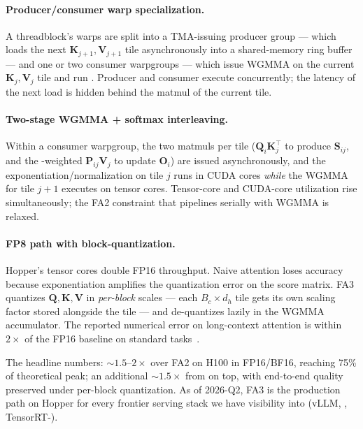 \paragraph{Producer/consumer warp specialization.} A threadblock's
warps are split into a TMA-issuing producer group --- which loads the
next $\boldsymbol{K}_{j+1}, \boldsymbol{V}_{j+1}$ tile asynchronously
into a shared-memory ring buffer --- and one or two consumer
warpgroups --- which issue WGMMA on the current
$\boldsymbol{K}_j, \boldsymbol{V}_j$ tile and run . Producer and
consumer execute concurrently; the latency of the next  load is
hidden behind the matmul of the current tile.

\paragraph{Two-stage WGMMA + softmax interleaving.} Within a consumer
warpgroup, the two matmuls per tile ($\boldsymbol{Q}_i
\boldsymbol{K}_j^\top$ to produce $\boldsymbol{S}_{ij}$, and the
-weighted $\boldsymbol{P}_{ij} \boldsymbol{V}_j$ to update
$\boldsymbol{O}_i$) are issued asynchronously, and the 
exponentiation/normalization on tile $j$ runs in CUDA cores
\emph{while} the WGMMA for tile $j+1$ executes on tensor cores.
Tensor-core and CUDA-core utilization rise simultaneously; the FA2
constraint that  pipelines serially with WGMMA is relaxed.

\paragraph{FP8 path with block-quantization.} Hopper's  tensor cores
double FP16 throughput. Naive  attention loses accuracy because
 exponentiation amplifies the  quantization error on the
score matrix. FA3 quantizes $\boldsymbol{Q}, \boldsymbol{K},
\boldsymbol{V}$ in \emph{per-block} scales --- each $B_c \times d_h$
 tile gets its own scaling factor stored alongside the tile --- and
de-quantizes lazily in the WGMMA accumulator. The reported numerical
error on long-context attention is within $2\times$ of the FP16
baseline on standard tasks~\citep{shah2024}.

The headline numbers: $\sim\!1.5\text{--}2\times$ over FA2 on H100 in
FP16/BF16, reaching 75\% of theoretical peak; an additional
$\sim\!1.5\times$ from  on top, with end-to-end quality preserved
under per-block quantization. As of 2026-Q2, FA3 is the production path
on Hopper for every frontier serving stack we have visibility into
(vLLM, , TensorRT-).

